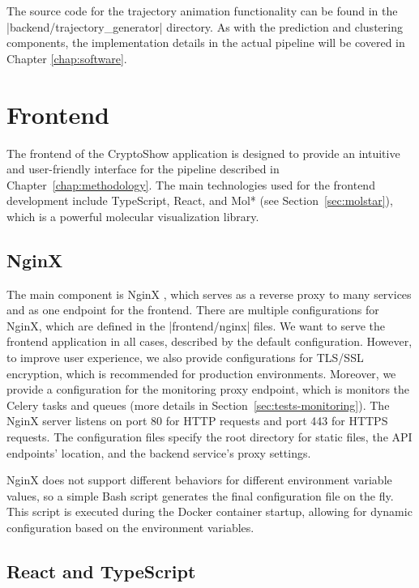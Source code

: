 The source code for the trajectory animation functionality can be found in the \inline|backend/trajectory_generator| directory. As with the prediction and clustering components, the implementation details in the actual pipeline will be covered in Chapter \ref{chap:software}.


\section{Frontend}
\label{sec:frontend}

The frontend of the CryptoShow application is designed to provide an intuitive and user-friendly interface for the pipeline described in Chapter~\ref{chap:methodology}. The main technologies used for the frontend development include TypeScript, React, and Mol* (see Section~\ref{sec:molstar}), which is a powerful molecular visualization library. 

\subsection{NginX}
\label{sec:nginx}

The main component is NginX \cite{reese2008nginx}, which serves as a reverse proxy to many services and as one endpoint for the frontend. There are multiple configurations for NginX, which are defined in the \inline|frontend/nginx| files. We want to serve the frontend application in all cases, described by the default configuration. However, to improve user experience, we also provide configurations for TLS/SSL encryption, which is recommended for production environments. Moreover, we provide a configuration for the monitoring proxy endpoint, which is monitors the Celery tasks and queues (more details in Section~\ref{sec:tests-monitoring}). The NginX server listens on port 80 for HTTP requests and port 443 for HTTPS requests. The configuration files specify the root directory for static files, the API endpoints' location, and the backend service's proxy settings.

NginX does not support different behaviors for different environment variable values, so a simple Bash script generates the final configuration file on the fly. This script is executed during the Docker container startup, allowing for dynamic configuration based on the environment variables.

\subsection{React and TypeScript}
\label{sec:react-typescript}


